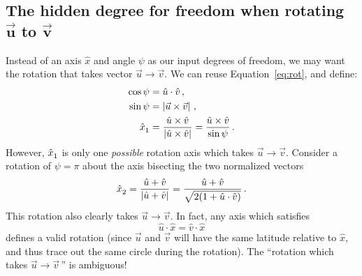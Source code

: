 \documentclass[12pt, nofootinbib, notitlepage]{revtex4}
\newcommand{\vecN}[1]{\hat{#1}}
\newcommand{\bs}[1]{\boldsymbol{#1}}
\newcommand{\ang}{\psi}
\newcommand{\vict}{\vec{w}}
\newcommand{\ax}{\vecN{x}}
\begin{document}

\subsection{The hidden degree for freedom when rotating $\bs{\vec{u}}$ to $\bs{\vec{v}}$}%
\label{sec:u-to-v}%
%
Instead of an axis $\ax$ and angle $\ang$ as our input degrees of freedom,
we may want the rotation that takes vector $\vec{u}\to\vec{v}$.
We can reuse Equation~\ref{eq:rot}, and define:
\begin{align}
	\cos\ang & = \vecN{u}\cdot\vecN{v}
	\,,\\
	\sin\ang & = \abs{\vec{u}\times\vec{v}}
	\,,\\
	\ax_1\ds & = \frac{\vecN{u}\times\vecN{v}}{\abs{\vecN{u}\times\vecN{v}}}
		= \frac{\vecN{u}\times\vecN{v}}{\sin\ang}\label{eq:x1}
	\,.
\end{align}
However, $\ax_1\ds$ is only one \emph{possible} rotation axis which takes 
$\vec{u}\to \vec{v}$. Consider a rotation of $\ang = \pi$ 
about the axis bisecting the two normalized vectors
\begin{equation}\label{eq:x2}
	\ax_2\ds = \frac{\vecN{u} + \vecN{v}}{\abs{\vecN{u} + \vecN{v}}} 
		= \frac{\vecN{u} + \vecN{v}}{\sqrt{2(1+\vecN{u}\cdot\vecN{v})}}
	\,.
\end{equation}
This rotation also clearly takes $\vec{u}\to\vec{v}$.
In fact, any axis which satisfies 
\begin{equation}
	\vecN{u}\cdot\ax = \vecN{v}\cdot\ax
\end{equation}
defines a valid rotation (since $\vec{u}$ and $\vec{v}$ will have 
the same latitude relative to $\ax$, 
and thus trace out the same circle during the rotation).
The ``rotation which takes $\vec{u}\to\vec{v}\,$'' is ambiguous!
\end{document}
